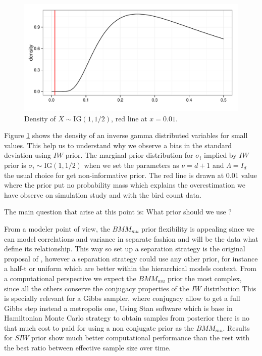 \documentclass{article}
\begin{document}
\begin{figure}[hbpt]
\centering
\includegraphics[width=\textwidth]{ig}
 \vspace{-.5in}
\caption{Density of $X\sim \mbox{IG}(1, 1/2)$, red line at $x=0.01$. \label{igamma} }
\end{figure}

Figure \ref{igamma} shows the density of an inverse gamma distributed variables for small values. This help us to understand why we observe a bias in the standard deviation using $IW$ prior. The marginal prior distribution for $\sigma_i$ implied by $IW$ prior is $\sigma_i \sim \mbox{IG}(1, 1/2)$ when we set the parameters as $\nu = d+1$ and $\Lambda=I_d$ the usual choice for get non-informative prior. The red line is drawn at 0.01 value where the prior put no probability mass which explains the overestimation we have observe on simulation study and with the bird count data. 


The main question that arise at this point is: What prior should we use ? 

From a modeler point of view, the $BMM_{mu}$ prior flexibility is appealing since we can model correlations and variance in separate fashion and will be the data what define its relationship.  This way so set up a separation strategy is the original proposal of \cite{barnard2000}, however a separation strategy could use any other prior, for instance a half-t or uniform which are better within the hierarchical models context.  From a computational perspective we expect the $BMM_{mu}$ prior the most complex, since all the others conserve the conjugacy properties of the $IW$ distribution This is specially relevant for a Gibbs sampler, where conjugacy allow to get a full Gibbs step instead a metropolis one, Using Stan software which is base in Hamiltonian Monte Carlo strategy to obtain samples from posterior there is no that much cost to paid for using a non conjugate prior as the $BMM_{mu}$.  Results for $SIW$ prior show much better computational performance than the rest with the best ratio between effective sample size over time.  
\end{document}
